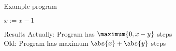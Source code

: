 \begin{block}{Example program}
  \begin{algorithmic}
    \State $x := x - 1$
    \EndWhile
  \end{algorithmic}
\end{block}
\begin{block}{Results}
  Actually: Program has $\maximum{0,x-y}$ steps \\
  Old: Program has maximum $\abs{x}+\abs{y}$ steps
\end{block}
  
